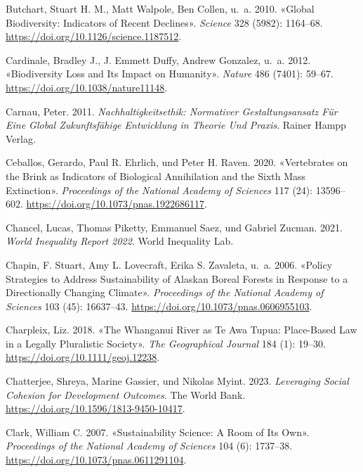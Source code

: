 \documentclass[
  nswissgerman,
  a4paper,
  openany]{book}
\newlength{\cslhangindent}
\newenvironment{CSLReferences}[2] %
 {\begin{list}{}{%
  \setlength{\itemindent}{0pt}
  \setlength{\leftmargin}{0pt}
  \setlength{\parsep}{0pt}
  \ifodd #1
   \setlength{\leftmargin}{\cslhangindent}
   \setlength{\itemindent}{-1\cslhangindent}
  \fi
  \setlength{\itemsep}{#2\baselineskip}}}
 {\end{list}}
\begin{document}
\begin{CSLReferences}{1}{1}
{Butchart, Stuart H. M., Matt Walpole, Ben Collen, u.~a.} 2010. {«Global
{Biodiversity}: {Indicators} of {Recent Declines}»}. \emph{Science} 328
(5982): 1164--68. \url{https://doi.org/10.1126/science.1187512}.

Cardinale, Bradley J., J. Emmett Duffy, Andrew Gonzalez, u.~a. 2012.
{«Biodiversity Loss and Its Impact on Humanity»}. \emph{Nature} 486
(7401): 59--67. \url{https://doi.org/10.1038/nature11148}.

Carnau, Peter. 2011. \emph{Nachhaltigkeitsethik: {Normativer
Gestaltungsansatz} F{ü}r Eine Global Zukunftsf{ä}hige {Entwicklung} in
{Theorie} Und {Praxis}}. Rainer Hampp Verlag.

Ceballos, Gerardo, Paul R. Ehrlich, und Peter H. Raven. 2020.
{«Vertebrates on the Brink as Indicators of Biological Annihilation and
the Sixth Mass Extinction»}. \emph{Proceedings of the National Academy
of Sciences} 117 (24): 13596--602.
\url{https://doi.org/10.1073/pnas.1922686117}.

Chancel, Lucas, Thomas Piketty, Emmanuel Saez, und Gabriel Zucman. 2021.
\emph{World {Inequality Report} 2022}. World Inequality Lab.

Chapin, F. Stuart, Amy L. Lovecraft, Erika S. Zavaleta, u.~a. 2006.
{«Policy Strategies to Address Sustainability of {Alaskan} Boreal
Forests in Response to a Directionally Changing Climate»}.
\emph{Proceedings of the National Academy of Sciences} 103 (45):
16637--43. \url{https://doi.org/10.1073/pnas.0606955103}.

Charpleix, Liz. 2018. {«The {Whanganui River} as {Te Awa Tupua}:
{Place-Based} Law in a Legally Pluralistic Society»}. \emph{The
Geographical Journal} 184 (1): 19--30.
\url{https://doi.org/10.1111/geoj.12238}.

Chatterjee, Shreya, Marine Gassier, und Nikolas Myint. 2023.
\emph{Leveraging {Social Cohesion} for {Development Outcomes}}. The
World Bank. \url{https://doi.org/10.1596/1813-9450-10417}.

Clark, William C. 2007. {«Sustainability {Science}: {A} Room of Its
Own»}. \emph{Proceedings of the National Academy of Sciences} 104 (6):
1737--38. \url{https://doi.org/10.1073/pnas.0611291104}.


\end{CSLReferences}
\end{document}
